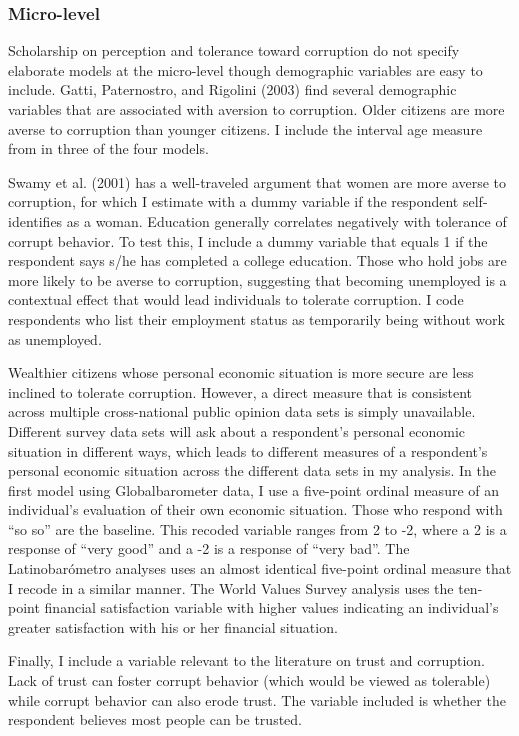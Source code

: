 \documentclass[11pt,]{article}
\begin{document}
\subsubsection{Micro-level}\label{micro-level}

Scholarship on perception and tolerance toward corruption do not specify
elaborate models at the micro-level though demographic variables are
easy to include. Gatti, Paternostro, and Rigolini (2003) find several
demographic variables that are associated with aversion to corruption.
Older citizens are more averse to corruption than younger citizens. I
include the interval age measure from in three of the four models.

Swamy et al. (2001) has a well-traveled argument that women are more
averse to corruption, for which I estimate with a dummy variable if the
respondent self-identifies as a woman. Education generally correlates
negatively with tolerance of corrupt behavior. To test this, I include a
dummy variable that equals 1 if the respondent says s/he has completed a
college education. Those who hold jobs are more likely to be averse to
corruption, suggesting that becoming unemployed is a contextual effect
that would lead individuals to tolerate corruption. I code respondents
who list their employment status as temporarily being without work as
unemployed.

Wealthier citizens whose personal economic situation is more secure are
less inclined to tolerate corruption. However, a direct measure that is
consistent across multiple cross-national public opinion data sets is
simply unavailable. Different survey data sets will ask about a
respondent's personal economic situation in different ways, which leads
to different measures of a respondent's personal economic situation
across the different data sets in my analysis. In the first model using
Globalbarometer data, I use a five-point ordinal measure of an
individual's evaluation of their own economic situation. Those who
respond with ``so so'' are the baseline. This recoded variable ranges
from 2 to -2, where a 2 is a response of ``very good'' and a -2 is a
response of ``very bad''. The Latinobarómetro analyses uses an almost
identical five-point ordinal measure that I recode in a similar manner.
The World Values Survey analysis uses the ten-point financial
satisfaction variable with higher values indicating an individual's
greater satisfaction with his or her financial situation.

Finally, I include a variable relevant to the literature on trust and
corruption. Lack of trust can foster corrupt behavior (which would be
viewed as tolerable) while corrupt behavior can also erode trust. The
variable included is whether the respondent believes most people can be
trusted.
\end{document}
